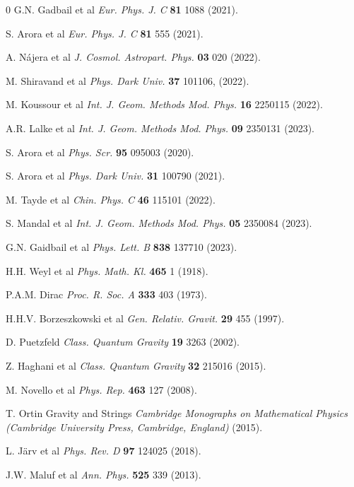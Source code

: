 \documentclass[aps,prd,showpacs,nofootinbib,floats,floatfix,preprintnumbers,groupedaddress,twocolumn]{revtex4-1}
\begin{document}
\begin{thebibliography}{0}
G.N. Gadbail et al \textit{Eur. Phys. J. C} \textbf{81} 1088 (2021).

S. Arora et al \textit{Eur. Phys. J. C} \textbf{81} 555 (2021).

A. Nájera et al \textit{J. Cosmol. Astropart. Phys.} \textbf{03} 020 (2022).

M. Shiravand et al \textit{Phys. Dark Univ.} \textbf{37} 101106, (2022).

M. Koussour et al \textit{Int. J. Geom. Methods Mod. Phys.} \textbf{16} 2250115 (2022).
 
A.R. Lalke et al \textit{Int. J. Geom. Methods Mod. Phys.} \textbf{09} 2350131 (2023).

S. Arora et al \textit{Phys. Scr.} \textbf{95} 095003 (2020).

S. Arora et al \textit{Phys. Dark Univ.} \textbf{31} 100790 (2021).

M. Tayde et al \textit{Chin. Phys. C} \textbf{46} 115101 (2022). 

S. Mandal et al \textit{Int. J. Geom. Methods Mod. Phys.} \textbf{05} 2350084 (2023).

 G.N. Gaidbail et al \textit{Phys. Lett. B} \textbf{838} 137710 (2023).
 
H.H. Weyl et al \textit{Phys. Math. Kl.} \textbf{465} 1 (1918).

P.A.M. Dirac \textit{Proc. R. Soc. A} \textbf{333} 403 (1973).

H.H.V. Borzeszkowski et al \textit{Gen. Relativ. Gravit.} \textbf{29} 455 (1997).

D. Puetzfeld \textit{Class. Quantum Gravity} \textbf{19} 3263 (2002).

Z. Haghani et al \textit{Class. Quantum Gravity} \textbf{32} 215016 (2015).

M. Novello et al \textit{Phys. Rep.} \textbf{463} 127 (2008).

T. Ortin Gravity and Strings \textit{Cambridge Monographs on Mathematical Physics (Cambridge University Press, Cambridge, England)} (2015).

L. Järv et al \textit{Phys. Rev. D} \textbf{97} 124025 (2018).

J.W. Maluf et al \textit{Ann. Phys.} \textbf{525} 339 (2013).


\end{thebibliography}
\end{document}
